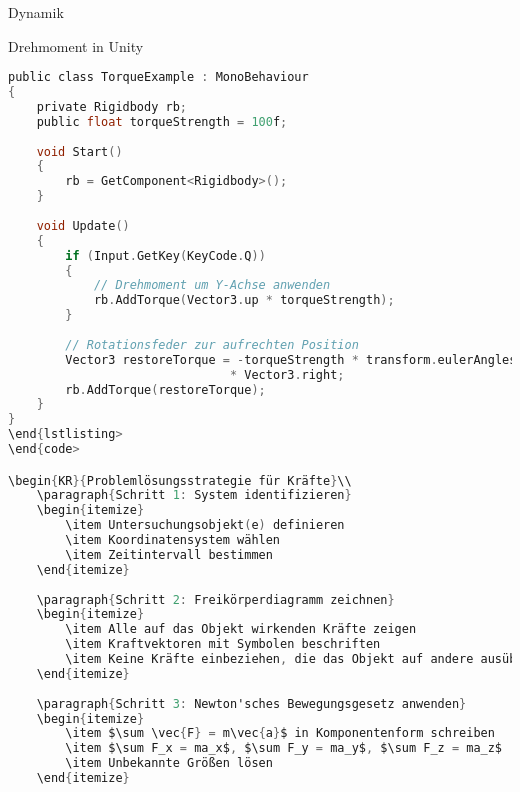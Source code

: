 \begin{definition}{Dynamik}
\begin{code}{Drehmoment in Unity}\\
\begin{lstlisting}[language=C, style=basesmol]
public class TorqueExample : MonoBehaviour 
{
    private Rigidbody rb;
    public float torqueStrength = 100f;
    
    void Start() 
    {
        rb = GetComponent<Rigidbody>();
    }
    
    void Update() 
    {
        if (Input.GetKey(KeyCode.Q)) 
        {
            // Drehmoment um Y-Achse anwenden
            rb.AddTorque(Vector3.up * torqueStrength);
        }
        
        // Rotationsfeder zur aufrechten Position
        Vector3 restoreTorque = -torqueStrength * transform.eulerAngles.x 
                               * Vector3.right;
        rb.AddTorque(restoreTorque);
    }
}
\end{lstlisting>
\end{code>

\begin{KR}{Problemlösungsstrategie für Kräfte}\\
    \paragraph{Schritt 1: System identifizieren}
    \begin{itemize}
        \item Untersuchungsobjekt(e) definieren
        \item Koordinatensystem wählen
        \item Zeitintervall bestimmen
    \end{itemize}
    
    \paragraph{Schritt 2: Freikörperdiagramm zeichnen}
    \begin{itemize}
        \item Alle auf das Objekt wirkenden Kräfte zeigen
        \item Kraftvektoren mit Symbolen beschriften
        \item Keine Kräfte einbeziehen, die das Objekt auf andere ausübt
    \end{itemize}
    
    \paragraph{Schritt 3: Newton'sches Bewegungsgesetz anwenden}
    \begin{itemize}
        \item $\sum \vec{F} = m\vec{a}$ in Komponentenform schreiben
        \item $\sum F_x = ma_x$, $\sum F_y = ma_y$, $\sum F_z = ma_z$
        \item Unbekannte Größen lösen
    \end{itemize}
    

\end{lstlisting}
\end{code}
\end{definition}
